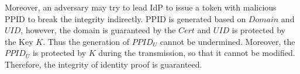 \begin{comment}
including 
\newline $PRPID=enc(\mathtt{Any Domain})_{key}$ and 
\newline $PPID=enc(hash(\mathtt{Any Domain}, \mathtt{Malicious UID}))_{key}$. 
\newline The $Malicious UID$ must belong to the adversary, while the $\mathtt{Any Domain}$ can be any registered RP domain.
There is no chance an adversary can get $key'$  satisfying that, 
\newline $dec(PRPID)_{key'} \equiv \mathtt{Honest Domain}$ and  
\newline $dec(PPID)_{key'} \equiv  hash(\mathtt{Honest RPDomain}, \mathtt{Honest UID})$.
\end{comment}

Moreover, 
an adversary may try to lead IdP to issue a token with malicious PPID to break the integrity indirectly.  PPID is generated based on $Domain$ and $UID$, however, the domain is guaranteed by the $Cert$ and $UID$ is protected by the Key $K$. Thus the generation of $PPID_U$ cannot be undermined. Moreover, the $PPID_U$ is protected by $K$ during the transmission, so that it cannot be modified. Therefore, the integrity of identity proof is guaranteed. 
\begin{comment}
\item An adversary may attempt to temper the $PPID$ while it is transmitted between enclave application and IdP server. However, $PPID$ is encrypted (step 17) and the key is only known to enclave application and IdP server (key exchange at step 10).
\item The adversary may also try to undermine the generation of $PPID$. 
The $PPID$ is generated based on $RPDomain$ and $UID$ (step 17). According to the description in RP designation, the $RPDomain$ must belong to the target RP. The $UID$ is retrieved according to authentication result at step 6, and encrypted.
\item The adversary may also try to steal an honest user's encrypted $PPID$ and $UID$, and set them in step 16 or step 19. However, in an honest user's device, the IdP script and enclave application are honest, so that they do not send encrypted $PPID$ and $UID$ to any malicious party. Moreover, we consider honest user's device is secure, so that the adversary cannot steal $PPID$ and $UID$ in the manners, such as intercepting communications in user's device.
\end{comment}


